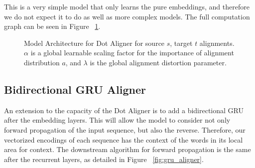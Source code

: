 \documentclass[twoside,twocolumn]{article}
\begin{document}
This is a very simple model that only learns the pure embeddings, and
therefore we do not expect it to do as well as more complex models.
The full computation graph can be seen in Figure ~\ref{fig:dot_aligner}.

\begin{figure}
  \centering
  \caption{Model Architecture for Dot Aligner for source $s$,
  target $t$ alignments. $\alpha$ is a global learnable scaling factor for
  the importance of alignment distribution $a$, and $\lambda$ is the
  global alignment distortion parameter.}
  \label{fig:dot_aligner}
\end{figure}

\subsection{Bidirectional GRU Aligner}

An extension to the capacity of the Dot Aligner is to add a
bidirectional GRU after the embedding layers. This will allow the
model to consider not only forward propagation of the input sequence,
but also the reverse. Therefore, our vectorized encodings of each
sequence has the context of the words in its local area for context.
The downstream algorithm for forward propagation is the same after
the recurrent layers, as detailed in Figure ~\ref{fig:gru_aligner}.
\end{document}
